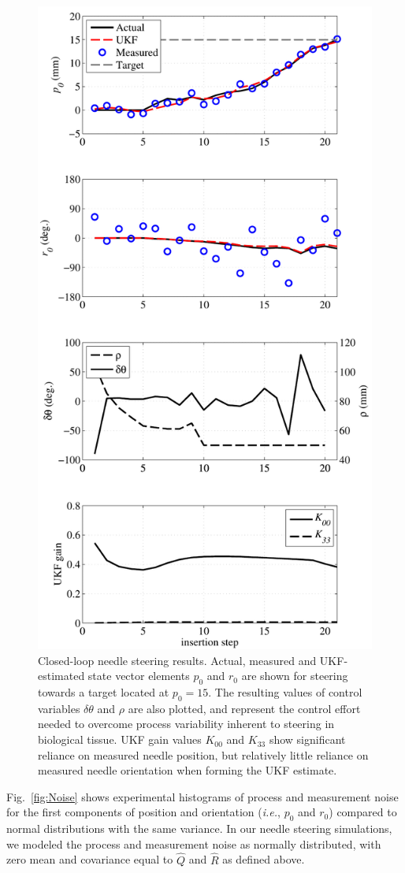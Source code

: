 \begin{figure}[!h]
\centering
\includegraphics[width=0.5\columnwidth]{Images/Chapter4/SimulationResults/SimulationResults}%
\caption[Closed-loop needle steering results]{Closed-loop needle steering results. Actual, measured and UKF-estimated state vector elements $p_0$ and $r_0$ are shown for steering towards a target located at $p_0 = 15$. The resulting values of control variables $\delta\theta$ and $\rho$ are also plotted, and represent the control effort needed to overcome process variability inherent to steering in biological tissue. UKF gain values $K_{00}$ and $K_{33}$ show significant reliance on measured needle position, but relatively little reliance on measured needle orientation when forming the UKF estimate. }
\label{fig:SimulationResults}
\end{figure}   

Fig.~\ref{fig:Noise} shows experimental histograms of process and measurement noise for the first components of position and orientation (\textit{i.e.}, $p_0$ and $r_0$) compared to normal distributions with the same variance. In our needle steering simulations, we modeled the process and measurement noise as normally distributed, with zero mean and covariance equal to ${\hat{Q}}$ and ${\hat{R}}$ as defined above.

